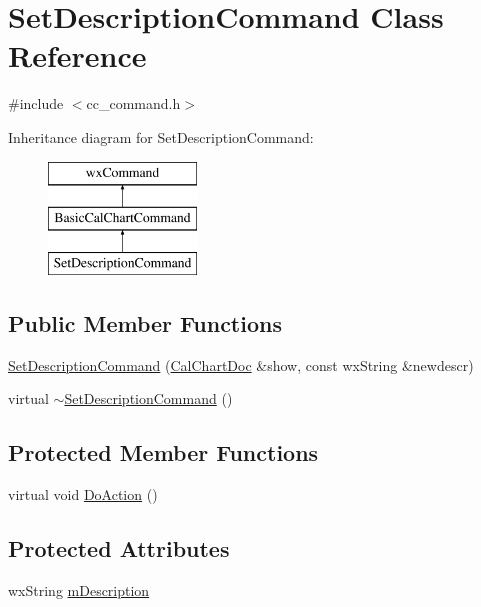\hypertarget{a00125}{\section{Set\-Description\-Command Class Reference}
\label{a00125}
}


{\ttfamily \#include $<$cc\-\_\-command.\-h$>$}

Inheritance diagram for Set\-Description\-Command\-:\begin{figure}[H]
\begin{center}
\leavevmode
\includegraphics[height=3.000000cm]{a00125}
\end{center}
\end{figure}
\subsection*{Public Member Functions}
\begin{DoxyCompactItemize}
\item 
\hyperlink{a00125_aae9a241fecc17949911b30a58f354cf1}{Set\-Description\-Command} (\hyperlink{a00020}{Cal\-Chart\-Doc} \&show, const wx\-String \&newdescr)
\item 
virtual \hyperlink{a00125_ab06076ade500a996ba8ea7876e5f04d6}{$\sim$\-Set\-Description\-Command} ()
\end{DoxyCompactItemize}
\subsection*{Protected Member Functions}
\begin{DoxyCompactItemize}
\item 
virtual void \hyperlink{a00125_a1e24fd27d87d38070e1823095d396d28}{Do\-Action} ()
\end{DoxyCompactItemize}
\subsection*{Protected Attributes}
\begin{DoxyCompactItemize}
\item 
wx\-String \hyperlink{a00125_a444f2db7c8e41b53b3a7327ab62c6445}{m\-Description}
\end{DoxyCompactItemize}



